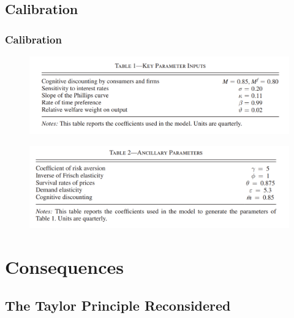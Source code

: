 \documentclass{beamer}
\newcommand\ReduceFont{\fontsize{10}{7.2}\selectfont}
\begin{document}
\subsection{Calibration}
\subsubsection{Calibration}
\begin{frame}{\subsecname}

\centering

\begin{figure}
  \centering
  \includegraphics[width=\linewidth]{./Graphs_Macro/Table1.png}
\end{figure}

\begin{figure}
  \centering
  \includegraphics[width=\linewidth]{./Graphs_Macro/Table2.png}
\end{figure}

\end{frame}


\section{Consequences}
\begin{frame}
    \ReduceFont
\end{frame}

\begin{frame}
    \tableofcontents[currentsection, hideothersubsections, sections=\value{section}]
\end{frame}

\subsection{The Taylor Principle Reconsidered}
\end{document}
